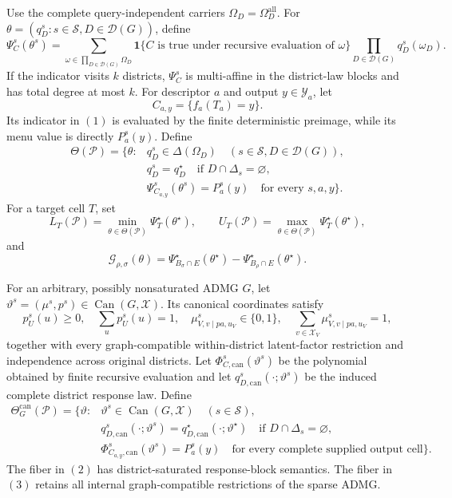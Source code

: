 Use the complete query-independent carriers \(\Omega_D=\Omega_D^{\mathrm{all}}\).  For \(\theta=(q_D^s:s\in\mathcal S,D\in\mathcal D(G))\), define
\[
\Psi_C^s(\theta^s)=
\sum_{\omega\in\prod_{D\in\mathcal D(G)}\Omega_D}
\mathbf 1\{C\text{ is true under recursive evaluation of }\omega\}
\prod_{D\in\mathcal D(G)}q_D^s(\omega_D).
\tag{1}
\]
If the indicator visits \(k\) districts, \(\Psi_C^s\) is multi-affine in the district-law blocks and has total degree at most \(k\).  For descriptor \(a\) and output \(y\in\mathcal Y_a\), let
\[
C_{a,y}=\{f_a(T_a)=y\}.
\]
Its indicator in \((1)\) is evaluated by the finite deterministic preimage, while its menu value is directly \(P_a^s(y)\).  Define
\[
\begin{split}
\Theta(\mathcal P)=\bigl\{\theta:{}&
q_D^s\in\Delta(\Omega_D)
\quad(s\in\mathcal S,D\in\mathcal D(G)),\\
&q_D^s=q_D^\star
\quad\text{if }D\cap\Delta_s=\varnothing,\\
&\Psi_{C_{a,y}}^s(\theta^s)=P_a^s(y)
\quad\text{for every }s,a,y\bigr\}.
\end{split}
\tag{2}
\]
For a target cell \(T\), set
\[
L_T(\mathcal P)=\min_{\theta\in\Theta(\mathcal P)}
\Psi_T^\star(\theta^\star),
\qquad
U_T(\mathcal P)=\max_{\theta\in\Theta(\mathcal P)}
\Psi_T^\star(\theta^\star),
\]
and
\[
\mathcal G_{\rho,\sigma}(\theta)=
\Psi_{B_\sigma\cap E}^\star(\theta^\star)
-\Psi_{B_\rho\cap E}^\star(\theta^\star).
\]

For an arbitrary, possibly nonsaturated ADMG \(G\), let \(\vartheta^s=(\mu^s,p^s)\in\operatorname{Can}(G,\mathcal X)\).  Its canonical coordinates satisfy
\[
p_U^s(u)\geq0,\quad\sum_up_U^s(u)=1,
\quad \mu_{V,v\mid pa,u_V}^s\in\{0,1\},
\quad \sum_{v\in\mathcal X_V}\mu_{V,v\mid pa,u_V}^s=1,
\]
together with every graph-compatible within-district latent-factor restriction and independence across original districts.  Let \(\Phi_{C,\mathrm{can}}^s(\vartheta^s)\) be the polynomial obtained by finite recursive evaluation and let \(q_{D,\mathrm{can}}^s(\cdot;\vartheta^s)\) be the induced complete district response law.  Define
\[
\begin{split}
\Theta_G^{\mathrm{can}}(\mathcal P)=\bigl\{\vartheta:{}&
\vartheta^s\in\operatorname{Can}(G,\mathcal X)
\quad(s\in\mathcal S),\\
&q_{D,\mathrm{can}}^s(\cdot;\vartheta^s)
=q_{D,\mathrm{can}}^\star(\cdot;\vartheta^\star)
\quad\text{if }D\cap\Delta_s=\varnothing,\\
&\Phi_{C_{a,y},\mathrm{can}}^s(\vartheta^s)=P_a^s(y)
\quad\text{for every complete supplied output cell}\bigr\}.
\end{split}
\tag{3}
\]
The fiber in \((2)\) has district-saturated response-block semantics.  The fiber in \((3)\) retains all internal graph-compatible restrictions of the sparse ADMG.